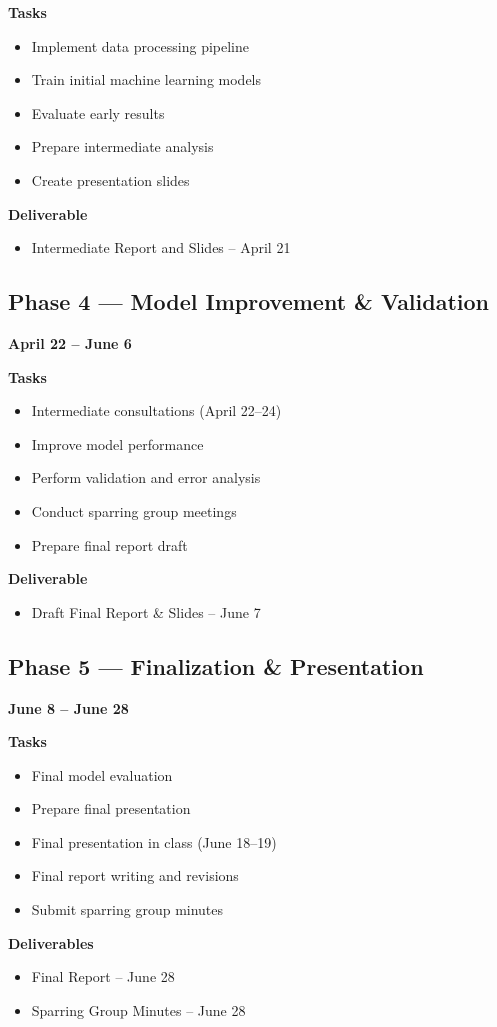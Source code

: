 \textbf{Tasks}
\begin{itemize}
\item Implement data processing pipeline
\item Train initial machine learning models
\item Evaluate early results
\item Prepare intermediate analysis
\item Create presentation slides
\end{itemize}

\textbf{Deliverable}
\begin{itemize}
\item Intermediate Report and Slides – April 21
\end{itemize}


\subsection*{Phase 4 — Model Improvement \& Validation}
\textbf{April 22 – June 6}

\textbf{Tasks}
\begin{itemize}
\item Intermediate consultations (April 22–24)
\item Improve model performance
\item Perform validation and error analysis
\item Conduct sparring group meetings
\item Prepare final report draft
\end{itemize}

\textbf{Deliverable}
\begin{itemize}
\item Draft Final Report \& Slides – June 7
\end{itemize}


\subsection*{Phase 5 — Finalization \& Presentation}
\textbf{June 8 – June 28}

\textbf{Tasks}
\begin{itemize}
\item Final model evaluation
\item Prepare final presentation
\item Final presentation in class (June 18–19)
\item Final report writing and revisions
\item Submit sparring group minutes
\end{itemize}

\textbf{Deliverables}
\begin{itemize}
\item Final Report – June 28
\item Sparring Group Minutes – June 28
\end{itemize}
